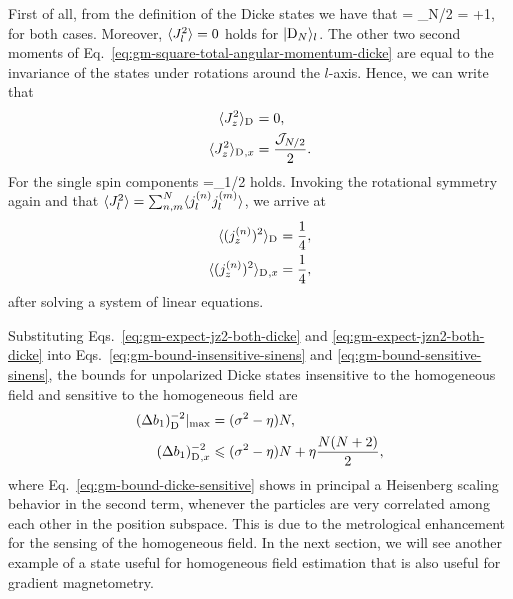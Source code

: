 First of all, from the definition of the Dicke states we have that
\be
   = _{N/2} = \lpar{}+1\rpar,
  \label{eq:gm-square-total-angular-momentum-dicke}
\ee
for both cases.
Moreover, $\langle{J_l^2}\rangle=0$ holds for $\vert{\ensuremath{\textnormal{D}_{N}}}\rangle_l$.
The other two second moments of Eq.~\eqref{eq:gm-square-total-angular-momentum-dicke} are equal to the invariance of the states under rotations around the $l$-axis.
Hence, we can write that
\begin{subequations}
  \begin{align}
    \langle{J_z^2}\rangle_{\textnormal{D}_{}} &= 0,\\
    \langle{J_z^2}\rangle_{\textnormal{D}_{},x} &= \frac{\mathcal{J}_{N/2}}{2}.
  \end{align}
  \label{eq:gm-expect-jz2-both-dicke}
\end{subequations}
For the single spin components
\be
  =_{1/2}
\ee
holds.
Invoking the rotational symmetry again and that $\langle{J_l^2}\rangle=\sum_{n,m}^N \langle{j_l^{(n)}j_l^{(m)}}\rangle$, we arrive at
\begin{subequations}
  \begin{align}
    \langle{(j_z^{(n)})^2}\rangle_{\textnormal{D}_{}}   &= \frac{1}{4},\\
    \langle{(j_z^{(n)})^2}\rangle_{\textnormal{D}_{},x} &= \frac{1}{4},
  \end{align}
  \label{eq:gm-expect-jzn2-both-dicke}
\end{subequations}
after solving a system of linear equations.

Substituting Eqs.~\eqref{eq:gm-expect-jz2-both-dicke} and \eqref{eq:gm-expect-jzn2-both-dicke} into Eqs.~\eqref{eq:gm-bound-insensitive-sinens} and \eqref{eq:gm-bound-sensitive-sinens}, the bounds for unpolarized Dicke states insensitive to the homogeneous field and sensitive to the homogeneous field are
\begin{subequations}
  \begin{align}
    (\Delta b_1 )^{-2}_{\textnormal{D}_{}}|_{\max} &= (\sigma^2 -\eta)N,
    \label{eq:gm-bound-dicke-insensitive} \\
    (\Delta b_1 )^{-2}_{\textnormal{D}_{},x} &\leqslant (\sigma^2 -\eta)N + \eta \frac{N(N+2)}{2},
    \label{eq:gm-bound-dicke-sensitive}
  \end{align}
\end{subequations}
where Eq.~\eqref{eq:gm-bound-dicke-sensitive} shows in principal a Heisenberg scaling behavior in the second term, whenever the particles are very correlated among each other in the position subspace.
This is due to the metrological enhancement for the sensing of the homogeneous field.
In the next section, we will see another example of a state useful for homogeneous field estimation that is also useful for gradient magnetometry.

